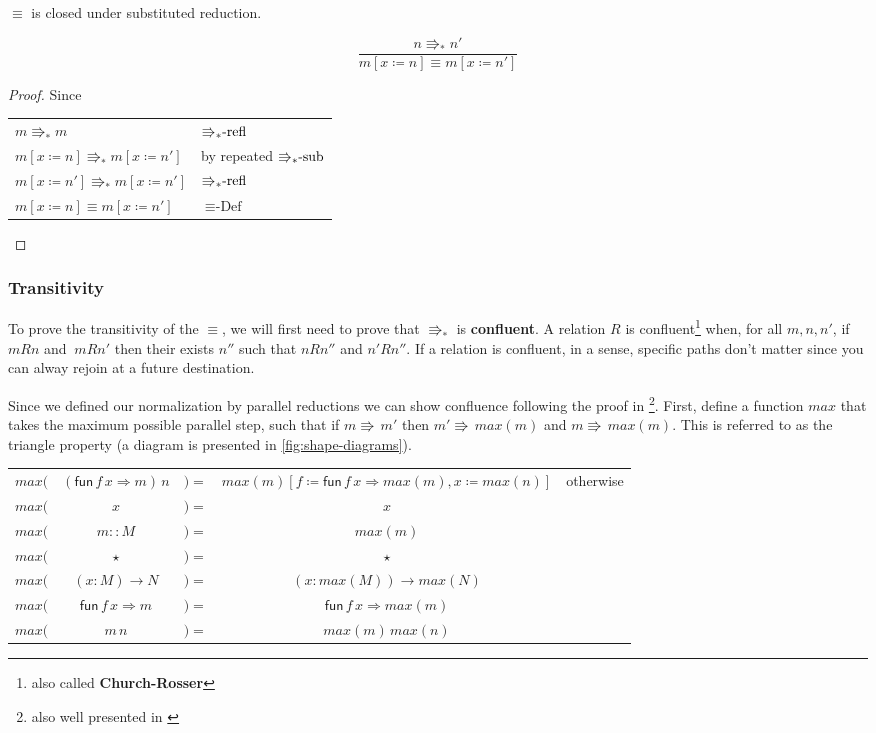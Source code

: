 \begin{cor}
$\equiv$ is closed under substituted reduction.
\end{cor}

\[
\frac{n\Rrightarrow_{\ast}n'}{m\left[x\coloneqq n\right]\equiv m\left[x\coloneqq n'\right]}
\]

\begin{proof}
Since

\begin{tabular}{ll}
$m\Rrightarrow_{\ast}m$ & $\textrm{\ensuremath{\Rrightarrow_{\ast}}-refl}$\tabularnewline
$m\left[x\coloneqq n\right]\Rrightarrow_{\ast}m\left[x\coloneqq n'\right]$ & by repeated $\textrm{\ensuremath{\Rrightarrow_{\ast}}-sub}$\tabularnewline
$m\left[x\coloneqq n'\right]\Rrightarrow_{\ast}m\left[x\coloneqq n'\right]$ & $\textrm{\ensuremath{\Rrightarrow_{\ast}}-refl}$\tabularnewline
$m\left[x\coloneqq n\right]\equiv m\left[x\coloneqq n'\right]$ & $\equiv\textrm{-Def}$\tabularnewline
\end{tabular}
\end{proof}

\subsubsection{Transitivity}

To prove the transitivity of the $\equiv$, we will first need to prove that \textbf{$\Rrightarrow_{\ast}$ }is \textbf{confluent}.
A relation $R$ is confluent\footnote{also called \textbf{Church-Rosser}} when, for all $m,n,n'$, if$mRn$ and $\:mRn'$ then their exists $n''$ such that $nRn''$ and $n'Rn''$.
If a relation is confluent, in a sense, specific paths don't matter since you can alway rejoin at a future destination.

Since we defined our normalization by parallel reductions we can show confluence following the proof in \cite{TAKAHASHI1995120}\footnote{also well presented in \cite{KOKKE2020102440}}.
First, define a function $max$ that takes the maximum possible parallel step, such that if $m\Rrightarrow\,m'$ then $m'\Rrightarrow\,max\left(m\right)$ and $m\Rrightarrow\,max\left(m\right)$.
This is referred to as the triangle property (a diagram is presented in \ref{fig:shape-diagrams}).

\begin{tabular}{ccccc}
$max($ & $\left(\mathsf{fun}\,f\,x\Rightarrow m\right)\,n$ & $)=$ & $max\left(m\right)\left[f\coloneqq\mathsf{fun}\,f\,x\Rightarrow max\left(m\right),x\coloneqq max\left(n\right)\right]$ & otherwise\tabularnewline
$max($ & $x$ & $)=$ & $x$ & \tabularnewline
$max($ & $m::M$ & $)=$ & $max\left(m\right)$ & \tabularnewline
$max($ & $\star$ & $)=$ & $\star$ & \tabularnewline
$max($ & $\left(x:M\right)\rightarrow N$ & $)=$ & $\left(x:max\left(M\right)\right)\rightarrow max\left(N\right)$ & \tabularnewline
$max($ & $\mathsf{fun}\,f\,x\Rightarrow m$ & $)=$ & $\mathsf{fun}\,f\,x\Rightarrow max\left(m\right)$ & \tabularnewline
$max($ & $m\,n$ & $)=$ & $max\left(m\right)\,max\left(n\right)$ & \tabularnewline
\end{tabular}

